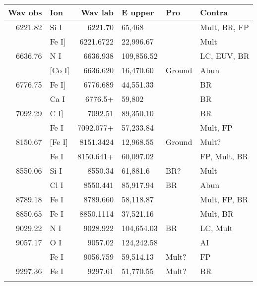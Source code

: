 \begin{tabular}{rlrlll}
Wav obs & Ion & Wav lab & E upper & Pro & Contra\\
\hline
6221.82 & Si I & 6221.70 & 65,468 &  & Mult, BR, FP\\
 & Fe I] & 6221.6722 & 22,996.67 &  & Mult\\
\hline
6636.76 & N I & 6636.938 & 109,856.52 &  & LC, EUV, BR\\
 & [Co I] & 6636.620 & 16,470.60 & Ground & Abun\\
\hline
6776.75 & Fe I] & 6776.689 & 44,551.33 &  & BR\\
 & Ca I & 6776.5+ & 59,802 &  & BR\\
\hline
7092.29 & C I] & 7092.51 & 89,350.10 &  & BR\\
 & Fe I & 7092.077+ & 57,233.84 &  & Mult, FP\\
\hline
8150.67 & [Fe I] & 8151.3424 & 12,968.55 & Ground & Mult?\\
 & Fe I & 8150.641+ & 60,097.02 &  & FP, Mult, BR\\
\hline
8550.06 & Si I & 8550.34 & 61,881.6 & BR? & Mult\\
 & Cl I & 8550.441 & 85,917.94 & BR & Abun\\
\hline
8789.18 & Fe I & 8789.660 & 58,118.87 &  & Mult, FP, BR\\
\hline
8850.65 & Fe I & 8850.1114 & 37,521.16 &  & Mult, BR\\
\hline
9029.22 & N  I & 9028.922 & 104,654.03 & BR & LC, Mult\\
\hline
9057.17 & O I & 9057.02 & 124,242.58 &  & AI\\
 & Fe I & 9056.759 & 59,514.13 & Mult? & FP\\
\hline
9297.36 & Fe I & 9297.61 & 51,770.55 & Mult? & BR\\
\hline
 &  &  &  &  & \\
\end{tabular}
